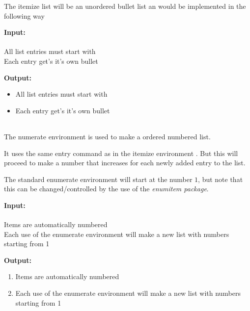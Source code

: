 The itemize list will be an unordered bullet list an would be implemented in the 
following way
\begin{multicols}{2}
    \begin{minipage}{\linewidth}
        \textbf{Input:} \\
         \\
         All list entries must start with  \\
         Each entry get's it's own bullet \\
    \end{minipage}
    
    \begin{minipage}{\linewidth}
        \textbf{Output: } \\
        \begin{itemize}
            \item All list entries must start with 
            \item Each entry get's it's own bullet
        \end{itemize}
    \end{minipage}
\end{multicols}

 \\
\indent The numerate environment is used to make a ordered numbered list.

It uses the same entry command as in the itemize environment . But 
this will proceed to make a number that increases for each newly added entry
to the list.

The standard enumerate environment will start at the number $1$, but note that 
this can be changed/controlled by the use of the \textit{enumitem package}.

\begin{multicols}{2}
    \begin{minipage}{\linewidth}
        \textbf{Input:} \\
         \\
         Items are automatically numbered \\
         Each use of the enumerate environment will make a new list 
                    with numbers starting from 1 \\
    \end{minipage}

    \begin{minipage}{\linewidth}
        \textbf{Output:} \\
        \begin{enumerate}
            \item Items are automatically numbered
            \item Each use of the enumerate environment will make a new list  
                    with numbers starting from 1
        \end{enumerate}
    \end{minipage}
\end{multicols}

